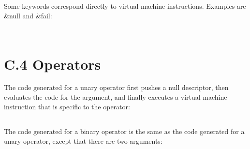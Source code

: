 Some keywords correspond directly to virtual machine
instructions. Examples are \&null and \&fail:

\begin{flushleft}
\tablelasttail{\hline}
\begin{xtabular}{|m{1.9066598in}|m{2.75596in}|}

\end{xtabular}
\end{flushleft}

\bigskip

\begin{flushleft}
\tablelasttail{\hline}
\begin{xtabular}{|m{1.9066598in}|m{2.75596in}|}

\end{xtabular}
\end{flushleft}


\section[C.4 Operators]{C.4 Operators}

The code generated for a unary operator first pushes a null
descriptor, then evaluates the code for the argument, and finally
executes a virtual machine instruction that is specific to the
operator:

\begin{flushleft}
\tablelasttail{\hline}
\begin{xtabular}{|m{1.9066598in}|m{2.75596in}|}

\end{xtabular}
\end{flushleft}

The code generated for a binary operator is the same as the code
generated for a unary operator, except that there are two arguments:

\begin{flushleft}
\tablelasttail{\hline}
\begin{xtabular}{|m{1.9066598in}|m{2.75596in}|}

\end{xtabular}
\end{flushleft}

